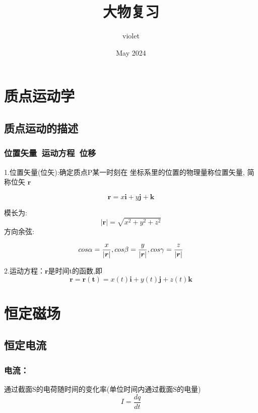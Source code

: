 \documentclass[12pt, a4paper, oneside]{ctexbook}
\title{\Huge{\textbf{大物复习}}}
\author{violet}
\date{May 2024}
\begin{document}
\maketitle

\setcounter{page}{1}

\newpage
{}
\setcounter{page}{1}
\tableofcontents
\newpage
\setcounter{page}{1}

\chapter{质点运动学}

\newpage

\section{质点运动的描述}
\subsection{位置矢量\ 运动方程\ 位移}

1.位置矢量(位矢):确定质点P某一时刻在
坐标系里的位置的物理量称位置矢量, 简称位矢
$ \boldsymbol{r} $

$$ \boldsymbol{r} =x\boldsymbol{i}+y\boldsymbol{j}+\boldsymbol{k} $$

模长为:
$$ \left|\boldsymbol{r}\right|=\sqrt{x^2+y^2+z^2} $$
方向余弦:

$$ 
    \\cos \alpha =\frac{x}{\left|\boldsymbol{r}\right|}
    ,\\cos \beta =\frac{y}{\left|\boldsymbol{r}\right|}
    ,\\cos \gamma =\frac{z}{\left|\boldsymbol{r}\right|}
$$ 

2.运动方程：$ \boldsymbol{r} $是时间t的函数,即
$$ 
    \boldsymbol{r} =\boldsymbol{r(t)}=x(t)\boldsymbol{i} +y(t)\boldsymbol{j} +z(t)\boldsymbol{k} 
$$

\newpage

\chapter{恒定磁场}

\newpage

\section{恒定电流}

\noindent 
\subsection{电流：}
通过截面S的电荷随时间的变化率(单位时间内通过截面S的电量)
$$ I=\frac{dq}{dt} $$
\end{document}
